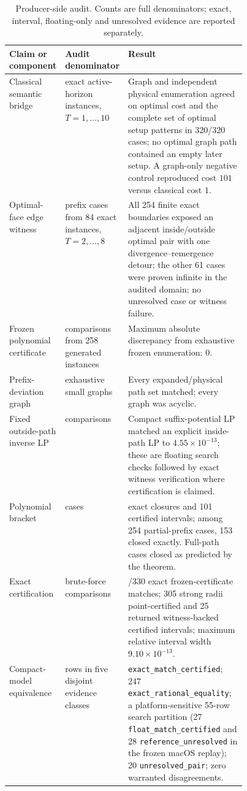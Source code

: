 \documentclass[11pt]{article}
\theoremstyle{definition}
\begin{document}
\begin{table}[p]
\centering
\caption{Producer-side audit. Counts are full denominators; exact, interval, floating-only and unresolved evidence are reported separately.}
\label{tab:audit}
\small
\begin{tabularx}{\linewidth}{@{}>{\raggedright\arraybackslash}p{0.23\linewidth}>{\raggedright\arraybackslash}p{0.22\linewidth}>{\raggedright\arraybackslash}X@{}}
\toprule
Claim or component & Audit denominator & Result \\
\midrule
Classical semantic bridge & 320 exact active-horizon instances, $T=1,\ldots,10$ & Graph and independent physical enumeration agreed on optimal cost and the complete set of optimal setup patterns in 320/320 cases; no optimal graph path contained an empty later setup. A graph-only negative control reproduced cost $101$ versus classical cost $1$. \\
Optimal-face edge witness & 315 prefix cases from 84 exact instances, $T=2,\ldots,8$ & All 254 finite exact boundaries exposed an adjacent inside/outside optimal pair with one divergence--remergence detour; the other 61 cases were proven infinite in the audited domain; no unresolved case or witness failure. \\
Frozen polynomial certificate & 512 comparisons from 258 generated instances & Maximum absolute discrepancy from exhaustive frozen enumeration: 0. \\
Prefix-deviation graph & 62 exhaustive small graphs & Every expanded/physical path set matched; every graph was acyclic. \\
Fixed outside-path inverse LP & 96 comparisons & Compact suffix-potential LP matched an explicit inside-path LP to $4.55\times10^{-13}$; these are floating search checks followed by exact witness verification where certification is claimed. \\
Polynomial bracket & 512 cases & 411 exact closures and 101 certified intervals; among 254 partial-prefix cases, 153 closed exactly. Full-path cases closed as predicted by the theorem. \\
Exact certification & 330 brute-force comparisons & 330/330 exact frozen-certificate matches; 305 strong radii point-certified and 25 returned witness-backed certified intervals; maximum relative interval width $9.10\times10^{-13}$. \\
Compact-model equivalence & 627 rows in five disjoint evidence classes & 305 \texttt{exact\_match\_certified}; 247 \texttt{exact\_rational\_equality}; a platform-sensitive 55-row search partition (27 \texttt{float\_match\_certified} and 28 \texttt{reference\_unresolved} in the frozen macOS replay); 20 \texttt{unresolved\_pair}; zero warranted disagreements. \\

\end{tabularx}
\end{table}
\end{document}
